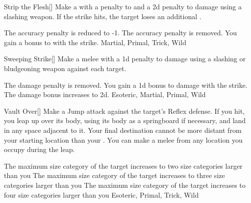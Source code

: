 \lowercase{\hypertarget{maneuver:Strip the Flesh}{}}\label{maneuver:Strip the Flesh}
\hypertarget{maneuver:Strip the Flesh}{}
\begin{freeability}[Rank 1]{Strip the Flesh}[]
Make a  with a  penalty to  and a \minus2d penalty to damage using a slashing weapon.
If the strike hits, the target loses an additional .

\rankline
{} The accuracy penalty is reduced to -1.
 The accuracy penalty is removed.
 You gain a  bonus to  with the strike.
 Martial, Primal, Trick, Wild
\end{freeability}
\vspace{0.25em}



\lowercase{\hypertarget{maneuver:Sweeping Strike}{}}\label{maneuver:Sweeping Strike}
\hypertarget{maneuver:Sweeping Strike}{}
\begin{freeability}[Rank 1]{Sweeping Strike}[]
Make a melee  with a \minus1d penalty to damage using a slashing or bludgeoning weapon against each target.

\rankline
{} The damage penalty is removed.
 You gain a \plus1d bonus to damage with the strike.
 The damage bonus increases to \plus2d.
 Esoteric, Martial, Primal, Wild
\end{freeability}
\vspace{0.25em}



\lowercase{\hypertarget{maneuver:Vault Over}{}}\label{maneuver:Vault Over}
\hypertarget{maneuver:Vault Over}{}
\begin{freeability}[Rank 1]{Vault Over}[]
Make a Jump attack against the target's Reflex defense.
If you hit, you leap up over its body, using its body as a springboard if necessary, and land in any space adjacent to it.
Your final destination cannot be more distant from your starting location than your .
You can make a melee  from any location you occupy during the leap.

\rankline
{} The maximum size category of the target increases to two size categories larger than you
 The maximum size category of the target increases to three size categories larger than you
 The maximum size category of the target increases to four size categories larger than you
 Esoteric, Primal, Trick, Wild
\end{freeability}
\vspace{0.25em}



